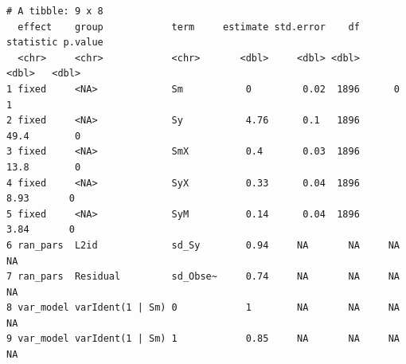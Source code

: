 \documentclass[
  letterpaper,
  DIV=11,
  numbers=noendperiod]{scrreprt}
\newenvironment{Shaded}{\begin{snugshade}}{\end{snugshade}}
\newcommand{\AttributeTok}[1]{\textcolor[rgb]{0.40,0.45,0.13}{#1}}
\newcommand{\CommentTok}[1]{\textcolor[rgb]{0.37,0.37,0.37}{#1}}
\newcommand{\ConstantTok}[1]{\textcolor[rgb]{0.56,0.35,0.01}{#1}}
\newcommand{\FloatTok}[1]{\textcolor[rgb]{0.68,0.00,0.00}{#1}}
\newcommand{\FunctionTok}[1]{\textcolor[rgb]{0.28,0.35,0.67}{#1}}
\newcommand{\NormalTok}[1]{\textcolor[rgb]{0.00,0.23,0.31}{#1}}
\newcommand{\OtherTok}[1]{\textcolor[rgb]{0.00,0.23,0.31}{#1}}
\newcommand{\SpecialCharTok}[1]{\textcolor[rgb]{0.37,0.37,0.37}{#1}}
\newcommand{\StringTok}[1]{\textcolor[rgb]{0.13,0.47,0.30}{#1}}
\begin{document}
\begin{tcolorbox}
\begin{verbatim}
# A tibble: 9 x 8
  effect    group            term     estimate std.error    df statistic p.value
  <chr>     <chr>            <chr>       <dbl>     <dbl> <dbl>     <dbl>   <dbl>
1 fixed     <NA>             Sm           0         0.02  1896      0          1
2 fixed     <NA>             Sy           4.76      0.1   1896     49.4        0
3 fixed     <NA>             SmX          0.4       0.03  1896     13.8        0
4 fixed     <NA>             SyX          0.33      0.04  1896      8.93       0
5 fixed     <NA>             SyM          0.14      0.04  1896      3.84       0
6 ran_pars  L2id             sd_Sy        0.94     NA       NA     NA         NA
7 ran_pars  Residual         sd_Obse~     0.74     NA       NA     NA         NA
8 var_model varIdent(1 | Sm) 0            1        NA       NA     NA         NA
9 var_model varIdent(1 | Sm) 1            0.85     NA       NA     NA         NA
\end{verbatim}

\begin{Shaded}
\end{Shaded}
\end{tcolorbox}
\end{document}
